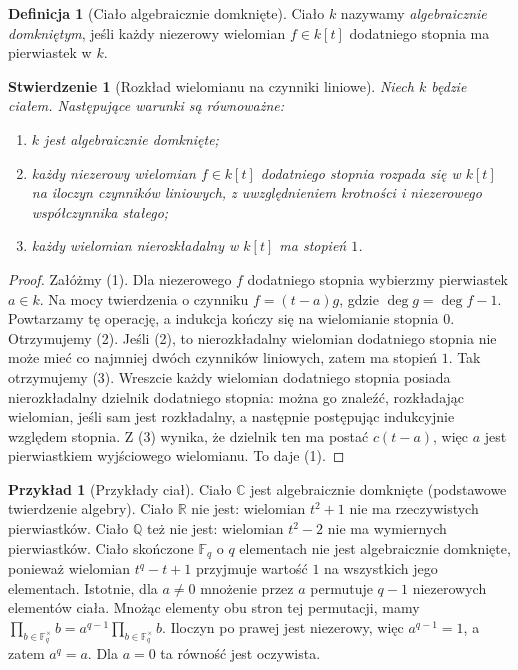 \documentclass[11pt,a4paper,openany]{report}
\numberwithin{equation}{section}
\theoremstyle{plain}
\newtheorem{stwierdzenie}[twierdzenie]{Stwierdzenie}
\theoremstyle{definition}
\newtheorem{definicja}[twierdzenie]{Definicja}
\newtheorem{przyklad}[twierdzenie]{Przykład}
\theoremstyle{remark}
\newcommand{\Q}{\mathbb Q}
\newcommand{\R}{\mathbb R}
\newcommand{\C}{\mathbb C}
\newcommand{\F}{\mathbb F}
\begin{document}
\begin{definicja}[Ciało algebraicznie domknięte]
Ciało $k$ nazywamy \emph{algebraicznie domkniętym}, jeśli każdy
niezerowy wielomian $f\in k[t]$ dodatniego stopnia ma pierwiastek w $k$.
\end{definicja}

\begin{stwierdzenie}[Rozkład wielomianu na czynniki liniowe]
Niech $k$ będzie ciałem. Następujące warunki są równoważne:
\begin{enumerate}[label=\arabic*)]
\item $k$ jest algebraicznie domknięte;
\item każdy niezerowy wielomian $f\in k[t]$ dodatniego stopnia
rozpada się w $k[t]$ na iloczyn czynników liniowych, z uwzględnieniem
krotności i niezerowego współczynnika stałego;
\item każdy wielomian nierozkładalny w $k[t]$ ma stopień $1$.
\end{enumerate}
\end{stwierdzenie}
\begin{proof}
Załóżmy (1). Dla niezerowego $f$ dodatniego stopnia wybierzmy
pierwiastek $a\in k$. Na mocy twierdzenia o czynniku
$f=(t-a)g$, gdzie $\deg g=\deg f-1$. Powtarzamy tę operację,
a indukcja kończy się na wielomianie stopnia $0$. Otrzymujemy (2).
Jeśli (2), to nierozkładalny wielomian dodatniego stopnia nie może
mieć co najmniej dwóch czynników liniowych, zatem ma stopień $1$.
Tak otrzymujemy (3). Wreszcie każdy wielomian dodatniego stopnia
posiada nierozkładalny dzielnik dodatniego stopnia:
można go znaleźć, rozkładając wielomian, jeśli sam jest rozkładalny,
a następnie postępując indukcyjnie względem stopnia.
Z (3) wynika, że dzielnik ten ma postać $c(t-a)$,
więc $a$ jest pierwiastkiem wyjściowego wielomianu. To daje (1).
\end{proof}

\begin{przyklad}[Przykłady ciał]
Ciało $\C$ jest algebraicznie domknięte (podstawowe twierdzenie algebry).
Ciało $\R$ nie jest: wielomian $t^2+1$ nie ma rzeczywistych pierwiastków.
Ciało $\Q$ też nie jest: wielomian $t^2-2$ nie ma wymiernych
pierwiastków. Ciało skończone $\F_q$ o $q$ elementach nie jest algebraicznie
domknięte, ponieważ wielomian $t^q-t+1$ przyjmuje wartość $1$
na wszystkich jego elementach. Istotnie, dla $a\ne0$
mnożenie przez $a$ permutuje $q-1$ niezerowych elementów ciała.
Mnożąc elementy obu stron tej permutacji, mamy
$\prod_{b\in\F_q^\times}b
=a^{q-1}\prod_{b\in\F_q^\times}b$.
Iloczyn po prawej jest niezerowy, więc $a^{q-1}=1$,
a zatem $a^q=a$. Dla $a=0$ ta równość jest oczywista.
\end{przyklad}
\end{document}

